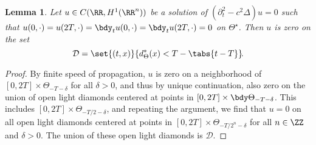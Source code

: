 \documentclass[10pt]{article}
\theoremstyle{plain}
\newtheorem{lemma}[theorem]{Lemma}
\theoremstyle{definition}
\theoremstyle{remark}
\numberwithin{theorem}{section}
\numberwithin{example}{section}
\numberwithin{equation}{section}
\numberwithin{figure}{section}
\newcommand\nobelowdisplayskip%
	{\setlength\belowdisplayskip{0pt}}						%
\let\d\bdy 						%
\begin{document}
\begin{lemma}
	\nobelowdisplayskip
	Let $u\in C(\RR,H^1(\RR^n))$ be a solution of $(\partial_t^2-c^2\Delta)u=0$ such that $u(0,\cdot)=u(2T,\cdot)=\d_t u(0,\cdot)=\d_t u(2T,\cdot)=0$ on $\Theta^\star$. Then $u$ is zero on the set
	\[
		\mathcal D = \set{(t,x)}{d^*_\Theta(x)<T-\tabs{t-T}}\!.
	\]	
	\label{l:uc-top-and-bottom}
\end{lemma}
\begin{proof}
	By finite speed of propagation, $u$ is zero on a neighborhood of $[0,2T]\times \Theta_{-T-\delta}$ for all $\delta>0$, and thus by unique continuation, also zero on the union of open light diamonds centered at points in $[0,2T]\times\bdy\Theta_{-T-\delta}$. This includes $[0,2T]\times \Theta_{-T/2-\delta}$, and repeating the argument, we find that $u=0$ on all open light diamonds centered at points in $[0,2T]\times \Theta_{-T/2^n-\delta}$ for all $n\in\ZZ$ and $\delta>0$. The union of these open light diamonds is $\mathcal D$.
\end{proof}
\end{document}
